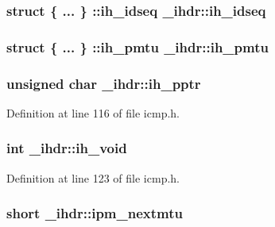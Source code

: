 \hypertarget{struct__ihdr_ac70ebc2c5e455cd6574dc9a7d593e360}{
\subsubsection[{ih\-\_\-idseq}]{\setlength{\rightskip}{0pt plus 5cm}struct \{ ... \} \-::{\bf ih\-\_\-idseq}  {\bf \-\_\-ihdr\-::ih\-\_\-idseq}}}\label{struct__ihdr_ac70ebc2c5e455cd6574dc9a7d593e360}
\hypertarget{struct__ihdr_ad3df54682f98c24d5cf737d5bdc05633}{
\subsubsection[{ih\-\_\-pmtu}]{\setlength{\rightskip}{0pt plus 5cm}struct \{ ... \} \-::{\bf ih\-\_\-pmtu}  {\bf \-\_\-ihdr\-::ih\-\_\-pmtu}}}\label{struct__ihdr_ad3df54682f98c24d5cf737d5bdc05633}
\hypertarget{struct__ihdr_a23a9d84c4095df74a9a9c0788db519c1}{
\subsubsection[{ih\-\_\-pptr}]{\setlength{\rightskip}{0pt plus 5cm}unsigned char {\bf \-\_\-ihdr\-::ih\-\_\-pptr}}}\label{struct__ihdr_a23a9d84c4095df74a9a9c0788db519c1}


\-Definition at line 116 of file icmp.\-h.

\hypertarget{struct__ihdr_a152872ebf0c8d333999a52c670d6d6c8}{
\subsubsection[{ih\-\_\-void}]{\setlength{\rightskip}{0pt plus 5cm}int {\bf \-\_\-ihdr\-::ih\-\_\-void}}}\label{struct__ihdr_a152872ebf0c8d333999a52c670d6d6c8}


\-Definition at line 123 of file icmp.\-h.

\hypertarget{struct__ihdr_add4f758969a104d48e295cfb9c07c243}{
\subsubsection[{ipm\-\_\-nextmtu}]{\setlength{\rightskip}{0pt plus 5cm}short {\bf \-\_\-ihdr\-::ipm\-\_\-nextmtu}}}\label{struct__ihdr_add4f758969a104d48e295cfb9c07c243}


